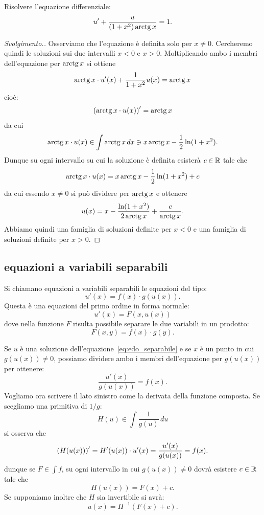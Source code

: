 \begin{exercise}
Risolvere l'equazione differenziale:
\[
 u' + \frac{u}{(1+x^2)\operatorname{arctg} x} = 1.
\]
\end{exercise}
%
\begin{proof}[Svolgimento.]
Osserviamo che l'equazione è definita solo per $x\neq 0$. Cercheremo quindi le soluzioni sui due intervalli $x<0$ e $x>0$.
Moltiplicando ambo i membri dell'equazione per $\operatorname{arctg} x$ si ottiene
\[
  \operatorname{arctg} x \cdot u'(x) +\frac{1}{1+x^2} u(x) = \operatorname{arctg} x
\]
cioè:
\[
  {\left( \operatorname{arctg} x \cdot u(x) \right)}' = \operatorname{arctg} x
\]
da cui
\[
  \operatorname{arctg} x \cdot u(x) \in \int \operatorname{arctg} x\, dx \ni x \operatorname{arctg} x - \frac {1}{2}\ln(1+x^2).
\]
Dunque su ogni intervallo su cui la soluzione è definita esisterà
$c\in \mathbb R$ tale che
\[
  \operatorname{arctg} x \cdot u(x) = x \operatorname{arctg} x - \frac{1}{2}\ln(1+x^2) + c
\]
da cui essendo $x\neq 0$ si può dividere per $\operatorname{arctg} x$ e ottenere
\[
  u(x) = x - \frac{\ln(1+x^2)}{2\operatorname{arctg} x} + \frac{c}{\operatorname{arctg} x}.
\]
Abbiamo quindi una famiglia di soluzioni definite per $x<0$ e una famiglia di soluzioni definite per $x>0$.
\end{proof}

\subsection{equazioni a variabili separabili}

Si chiamano equazioni a variabili separabili le
equazioni del tipo:
\mymark{***}
\begin{equation}\label{eq:edo_separabile}
  u'(x) = f(x) \cdot g(u(x)).
\end{equation}
Questa è una equazioni del primo ordine in forma normale:
\[
  u'(x) = F(x, u(x))
\]
dove nella funzione $F$ risulta possibile separare le
due variabili in un prodotto:
\[
  F(x, y) = f(x)\cdot g(y).
\]

Se $u$ è una soluzione dell'equazione~\eqref{eq:edo_separabile}
e se $x$ è un punto in cui $g(u(x))\neq 0$, possiamo dividere ambo i membri dell'equazione per $g(u(x))$ per ottenere:
\[
  \frac{u'(x)}{g(u(x))} = f(x).
\]
Vogliamo ora scrivere il lato sinistro come la derivata della funzione composta. Se scegliamo una primitiva di $1/g$:
\[
  H(u) \in \int \frac{1}{g(u)}\, du
\]
si osserva che
\[
  {\left( H(u(x)) \right)}' = H'(u(x))\cdot u'(x) = \frac{u'(x)}{g(u(x))} = f(x).
\]
dunque se $F\in \int f$, su ogni intervallo in cui $g(u(x))\neq 0$ dovrà esistere $c\in \mathbb R$ tale che
\[
  H(u(x)) = F(x) + c.
\]
Se supponiamo inoltre che $H$ sia invertibile si avrà:
\[
  u(x) = H^{-1}(F(x)+ c).
\]

